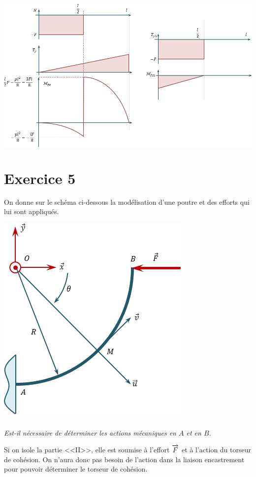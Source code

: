 \documentclass[10pt,fleqn]{article} %
\begin{document}
\begin{multicols}{2}
\begin{corrige}
\begin{center}
\includegraphics[width=.95\linewidth]{images/exo_03_corr_03}
\end{center}
\end{corrige}
\else 
\fi


\section*{Exercice 5}
\setcounter{subparagraph}{0}
On donne sur le schéma ci-dessous la modélisation d'une poutre et des efforts qui lui sont appliqués.
\begin{center}
\includegraphics[width=.45\textwidth]{images/exo_04}
\end{center}

\subparagraph{}
\textit{Est-il nécessaire de déterminer les actions mécaniques en $A$ et en $B$.}
\ifprof
\begin{corrige}
Si on isole la partie <<II>>, elle est soumise à l'effort $\overrightarrow{F}$ et à l'action du torseur de cohésion. On n'aura donc pas besoin de l'action dans la liaison encastrement pour pouvoir déterminer le torseur de cohésion. 
\end{corrige}
\else 
\fi



\end{multicols}
\end{document}
